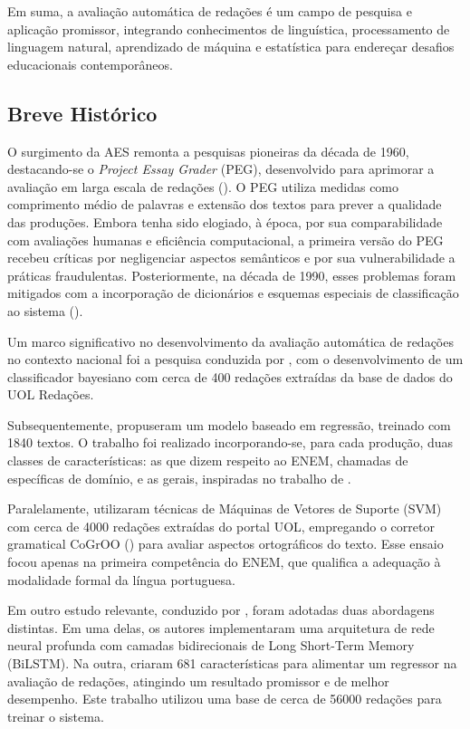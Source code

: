 Em suma, a avaliação automática de redações é um campo de pesquisa e aplicação promissor, integrando conhecimentos de linguística, processamento de linguagem natural, aprendizado de máquina e estatística para endereçar desafios educacionais contemporâneos.

\subsection{Breve Histórico}

O surgimento da AES remonta a pesquisas pioneiras da década de 1960, destacando-se o \textit{Project Essay Grader} (PEG), desenvolvido para aprimorar a avaliação em larga escala de redações (\cite{page-1966}). O PEG utiliza medidas como comprimento médio de palavras e extensão dos textos para prever a qualidade das produções. Embora tenha sido elogiado, à época, por sua comparabilidade com avaliações humanas e eficiência computacional, a primeira versão do PEG recebeu críticas por negligenciar aspectos semânticos e por sua vulnerabilidade a práticas fraudulentas. Posteriormente, na década de 1990, esses problemas foram mitigados com a incorporação de dicionários e esquemas especiais de classificação ao sistema (\cite{felicia-et-al-2002}).

Um marco significativo no desenvolvimento da avaliação automática de redações no contexto nacional foi a pesquisa conduzida por \citet{amorim-et-al-2013}, com o desenvolvimento de um classificador bayesiano com cerca de 400 redações extraídas da base de dados do UOL Redações.

Subsequentemente, \citet{amorim-et-al-2017} propuseram um modelo baseado em regressão, treinado com 1840 textos. O trabalho foi realizado incorporando-se, para cada produção, duas classes de características: as que dizem respeito ao ENEM, chamadas de específicas de domínio, e as gerais, inspiradas no trabalho de \citet{attali-burstein-2006}.

Paralelamente, \citet{junior-et-al-2017} utilizaram técnicas de Máquinas de Vetores de Suporte (SVM) com cerca de 4000 redações extraídas do portal UOL, empregando o corretor gramatical CoGrOO (\cite{silva-2013}) para avaliar aspectos ortográficos do texto. Esse ensaio focou apenas na primeira competência do ENEM, que qualifica a adequação à modalidade formal da língua portuguesa.

Em outro estudo relevante, conduzido por \citet{fonseca-et-al-2018}, foram adotadas duas abordagens distintas. Em uma delas, os autores implementaram uma arquitetura de rede neural profunda com camadas bidirecionais de Long Short-Term Memory (BiLSTM). Na outra, criaram 681 características para alimentar um regressor na avaliação de redações, atingindo um resultado promissor e de melhor desempenho. Este trabalho utilizou uma base de cerca de 56000 redações para treinar o sistema.

